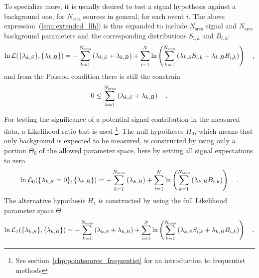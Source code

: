 To specialize more, it is usually desired to test a signal hypothesis against a background one, for $N_\text{srcs}$ sources in general, for each event $i$.
The above expression~(\ref{equ:extended_llh}) is thus expanded to include $N_\text{srcs}$ signal and $N_\text{srcs}$ background parameters and the corresponding distributions $S_{i,k}$ and $B_{i,k}$:
\begin{equation}
  \ln\mathcal{L}(\{\lambda_{k,S}\}, \{\lambda_{k,B}\})
  = -\sum_{k=1}^{N_\text{srcs}}\left(\lambda_{k,S}+\lambda_{k,B}\right) +
    \sum_{i=1}^N \ln\left(\sum_{k=1}^{N_\text{srcs}}\left(
      \lambda_{k,S} S_{i,k}+\lambda_{k,B} B_{i,k}\right)\right)
  \quad\text{,}
\end{equation}
and from the Poisson condition there is still the constrain
\begin{equation}
  0 \leq \sum_{k=1}^{N_\text{srcs}}\left(\lambda_{k,S}+\lambda_{k,B}\right)
  \quad\text{.}
\end{equation}

For testing the significance of a potential signal contribution in the measured data, a Likelihood ratio test is used \footnote{See section~\ref{chp:pointsource_frequentist} for an introduction to frequentist methods}.
The null hypotheses $H_0$, which means that only background is expected to be measured, is constructed by using only a portion $\Theta_0$ of the allowed parameter space, here by setting all signal expectations to zero
\begin{equation}
  \ln\mathcal{L}_0(\{\lambda_{k,S}=0\}, \{\lambda_{k,B}\})
  = -\sum_{k=1}^{N_\text{srcs}}\left(\lambda_{k,B}\right) +
    \sum_{i=1}^N \ln\left(\sum_{k=1}^{N_\text{srcs}}\left(
      \lambda_{k,B} B_{i,k}\right)\right)
  \quad\text{.}
\end{equation}
The alternative hypothesis $H_1$ is constructed by using the full Likelihood parameter space $\Theta$
\begin{equation}
  \ln\mathcal{L}_1(\{\lambda_{k,S}\}, \{\lambda_{k,B}\})
  = -\sum_{k=1}^{N_\text{srcs}}\left(\lambda_{k,S}+
                                     \lambda_{k,B}\right) +
    \sum_{i=1}^N \ln\left(\sum_{k=1}^{N_\text{srcs}}\left(
      \lambda_{k,S} S_{i,k}+\lambda_{k,B} B_{i,k}\right)\right)
  \quad\text{.}
\end{equation}

